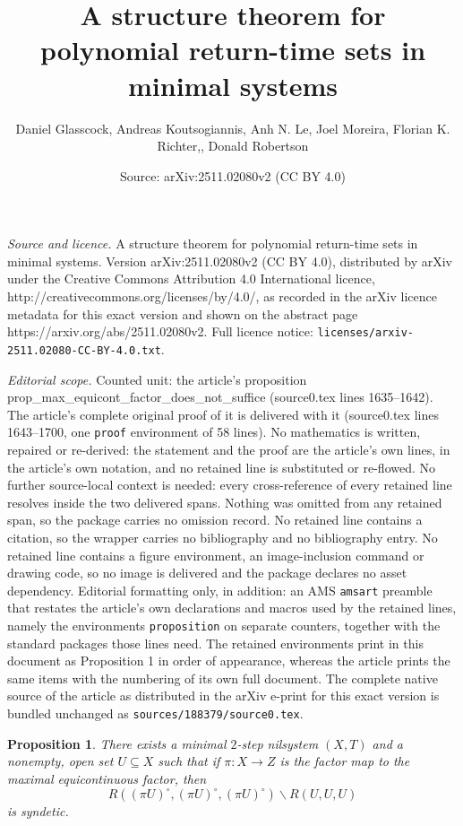 \documentclass[10pt,a4paper]{amsart}
\title{A structure theorem for polynomial return-time sets in minimal systems}
\author{Daniel Glasscock, Andreas Koutsogiannis, Anh N. Le, Joel Moreira, Florian K. Richter,, Donald Robertson}
\date{Source: arXiv:2511.02080v2 (CC BY 4.0)}
\newtheorem{proposition}{Proposition}
\renewcommand{\setminus}{\backslash}
\begin{document}
\maketitle

\noindent\emph{Source and licence.} A structure theorem for polynomial return-time sets in minimal systems. Version arXiv:2511.02080v2 (CC BY 4.0), distributed by arXiv under the Creative Commons Attribution 4.0 International licence, http://creativecommons.org/licenses/by/4.0/, as recorded in the arXiv licence metadata for this exact version and shown on the abstract page https://arxiv.org/abs/2511.02080v2. Full licence notice: \texttt{licenses/arxiv-2511.02080-CC-BY-4.0.txt}.\par\smallskip

\noindent\textit{Editorial scope.} Counted unit: the article's proposition prop\_max\_equicont\_factor\_does\_not\_suffice (source0.tex lines 1635--1642). The article's complete original proof of it is delivered with it (source0.tex lines 1643--1700, one \texttt{proof} environment of 58 lines). No mathematics is written, repaired or re-derived: the statement and the proof are the article's own lines, in the article's own notation, and no retained line is substituted or re-flowed.  No further source-local context is needed: every cross-reference of every retained line resolves inside the two delivered spans.  Nothing was omitted from any retained span, so the package carries no omission record.  No retained line contains a citation, so the wrapper carries no bibliography and no bibliography entry.  No retained line contains a figure environment, an image-inclusion command or drawing code, so no image is delivered and the package declares no asset dependency.  Editorial formatting only, in addition: an AMS \texttt{amsart} preamble that restates the article's own declarations and macros used by the retained lines, namely the environments \texttt{proposition} on separate counters, together with the standard packages those lines need.  The retained environments print in this document as Proposition 1 in order of appearance, whereas the article prints the same items with the numbering of its own full document.  The complete native source of the article as distributed in the arXiv e-print for this exact version is bundled unchanged as \texttt{sources/188379/source0.tex}.
\begin{proposition}
\label{prop_max_equicont_factor_does_not_suffice}
There exists a minimal $2$-step nilsystem $(X, T)$ and a nonempty, open set $U \subseteq X$ such that if $\pi: X \to Z$ is the factor map to the maximal equicontinuous factor, then
\[
    R((\pi U)^\circ, (\pi U)^\circ, (\pi U)^\circ) \setminus R(U, U, U)
\]
is syndetic.
\end{proposition}
\end{document}

